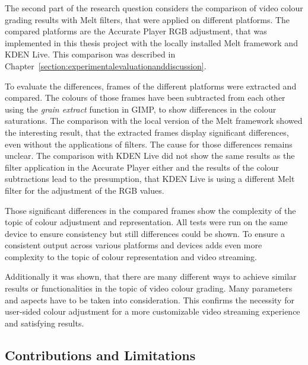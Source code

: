 \documentclass[../MasterThesis.tex]{subfiles}
\begin{document}
The second part of the research question considers the comparison of video colour grading results with Melt filters, that were applied on different platforms. The compared platforms are the Accurate Player RGB adjustment, that was implemented in this thesis project with the locally installed Melt framework and KDEN Live. This comparison was described in Chapter~\ref{section:experimentalevaluationanddiscussion}.


To evaluate the differences, frames of the different platforms were extracted and compared. 
The colours of those frames have been subtracted from each other using the \textit{grain extract} function in GIMP, to show differences in the colour saturations.
The comparison with the local version of the Melt framework showed the interesting result, that the extracted frames display significant differences, even without the applications of filters. The cause for those differences remains unclear.
The comparison with KDEN Live did not show the same results as the filter application in the Accurate Player either and the results of the colour subtractions lead to the presumption, that KDEN Live is using a different Melt filter for the adjustment of the RGB values.

Those significant differences in the compared frames show the complexity of the topic of colour adjustment and representation. All tests were run on the same device to ensure consistency but still differences could be shown. To ensure a consistent output across various platforms and devices adds even more complexity to the topic of colour representation and video streaming.


Additionally it was shown, that there are many different ways to achieve similar results or functionalities in the topic of video colour grading. Many parameters and aspects have to be taken into consideration. This confirms the necessity for user-sided colour adjustment for a more customizable video streaming experience and satisfying results. 





\subsection{Contributions and Limitations} \label{subsection:contributionslimitations}
\end{document}
